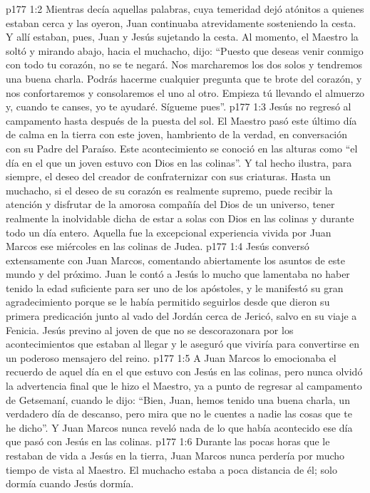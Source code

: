 \vs p177 1:2 Mientras decía aquellas palabras, cuya temeridad dejó atónitos a quienes estaban cerca y las oyeron, Juan continuaba atrevidamente sosteniendo la cesta. Y allí estaban, pues, Juan y Jesús sujetando la cesta. Al momento, el Maestro la soltó y mirando abajo, hacia el muchacho, dijo: “Puesto que deseas venir conmigo con todo tu corazón, no se te negará. Nos marcharemos los dos solos y tendremos una buena charla. Podrás hacerme cualquier pregunta que te brote del corazón, y nos confortaremos y consolaremos el uno al otro. Empieza tú llevando el almuerzo y, cuando te canses, yo te ayudaré. Sígueme pues”.
\vs p177 1:3 Jesús no regresó al campamento hasta después de la puesta del sol. El Maestro pasó este último día de calma en la tierra con este joven, hambriento de la verdad, en conversación con su Padre del Paraíso. Este acontecimiento se conoció en las alturas como “el día en el que un joven estuvo con Dios en las colinas”. Y tal hecho ilustra, para siempre, el deseo del creador de confraternizar con sus criaturas. Hasta un muchacho, si el deseo de su corazón es realmente supremo, puede recibir la atención y disfrutar de la amorosa compañía del Dios de un universo, tener realmente la inolvidable dicha de estar a solas con Dios en las colinas y durante todo un día entero. Aquella fue la excepcional experiencia vivida por Juan Marcos ese miércoles en las colinas de Judea.
\vs p177 1:4 Jesús conversó extensamente con Juan Marcos, comentando abiertamente los asuntos de este mundo y del próximo. Juan le contó a Jesús lo mucho que lamentaba no haber tenido la edad suficiente para ser uno de los apóstoles, y le manifestó su gran agradecimiento porque se le había permitido seguirlos desde que dieron su primera predicación junto al vado del Jordán cerca de Jericó, salvo en su viaje a Fenicia. Jesús previno al joven de que no se descorazonara por los acontecimientos que estaban al llegar y le aseguró que viviría para convertirse en un poderoso mensajero del reino.
\vs p177 1:5 A Juan Marcos lo emocionaba el recuerdo de aquel día en el que estuvo con Jesús en las colinas, pero nunca olvidó la advertencia final que le hizo el Maestro, ya a punto de regresar al campamento de Getsemaní, cuando le dijo: “Bien, Juan, hemos tenido una buena charla, un verdadero día de descanso, pero mira que no le cuentes a nadie las cosas que te he dicho”. Y Juan Marcos nunca reveló nada de lo que había acontecido ese día que pasó con Jesús en las colinas.
\vs p177 1:6 Durante las pocas horas que le restaban de vida a Jesús en la tierra, Juan Marcos nunca perdería por mucho tiempo de vista al Maestro. El muchacho estaba a poca distancia de él; solo dormía cuando Jesús dormía.
